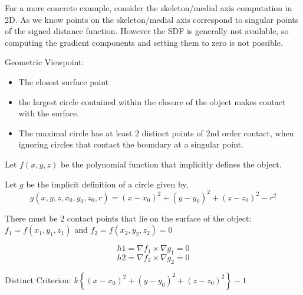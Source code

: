\documentclass{beamer}
\begin{document}
	\begin{frame}
		For a more concrete example, consider the skeleton/medial axis computation in 2D. As we know points on the skeleton/medial axis correspond to singular points of the signed distance function. However the SDF is generally not available, so computing the gradient components and setting them to zero is not possible.
		
		\vspace{0.2in}
		Geometric Viewpoint:
		\begin{itemize}
			\item The closest surface point
			\item the largest circle contained within the closure of the object makes contact with the surface.
			\item The maximal circle has at least 2 distinct points of 2nd order contact, when ignoring circles that contact the boundary at a singular point.

		\end{itemize}		
		
				
		
	\end{frame}
	
	\begin{frame}
		Let $f(x,y,z)$ be the polynomial function that implicitly defines the object.
		
		Let $g$ be the implicit definition of a circle given by,
		$$g(x,y,z,x_0,y_0,z_0,r) = (x-x_0)^2 + (y-y_0)^2 + (z-z_0)^2 - r^2$$
		
		There must be 2 contact points that lie on the surface of the object:
		$f_1 = f(x_1,y_1,z_1) $ and $f_2 = f(x_2,y_2,z_2) = 0$
		
		$$h1 = \nabla f_1 \times \nabla g_1 = 0 $$
		$$h2 = \nabla f_2 \times \nabla g_2 = 0 $$
		
		Distinct Criterion: $k\left\{(x-x_0)^2 + (y-y_0)^2 + (z-z_0)^2\right\} - 1$		
		
		
	\end{frame}
	
\end{document}
